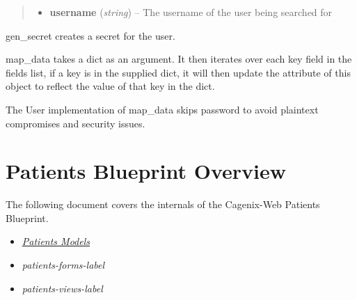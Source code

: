 \documentclass[letterpaper,10pt,english]{sphinxmanual}
\begin{document}
\begin{fulllineitems}
\begin{fulllineitems}
\begin{quote}
\begin{description}
\begin{itemize}
\item {} 
\textbf{username} (\emph{string}) -- The username of the user being searched for

\end{itemize}

\end{description}\end{quote}

\end{fulllineitems}


\begin{fulllineitems}
\label{dev-users:cagenix.users.models.User.gen_secret}
gen\_secret creates a secret for the user.

\end{fulllineitems}


\begin{fulllineitems}
\label{dev-users:cagenix.users.models.User.map_data}
map\_data takes a dict as an argument. It then iterates
over each key field in the fields list, if a key is
in the supplied dict, it will then update the attribute of
this object to reflect the value of that key in the dict.

The User implementation of map\_data skips password to avoid plaintext
compromises and security issues.

\end{fulllineitems}


\end{fulllineitems}



\chapter{Patients Blueprint Overview}
\label{dev-patients::doc}\label{dev-patients:patients-blueprint-overview}
The following document covers the internals of the Cagenix-Web Patients
Blueprint.
\begin{itemize}
\item {} 
{\hyperref[dev-patients:patients-models-label]{\emph{Patients Models}}}

\item {} 
\emph{patients-forms-label}

\item {} 
\emph{patients-views-label}

\end{itemize}
\end{document}

